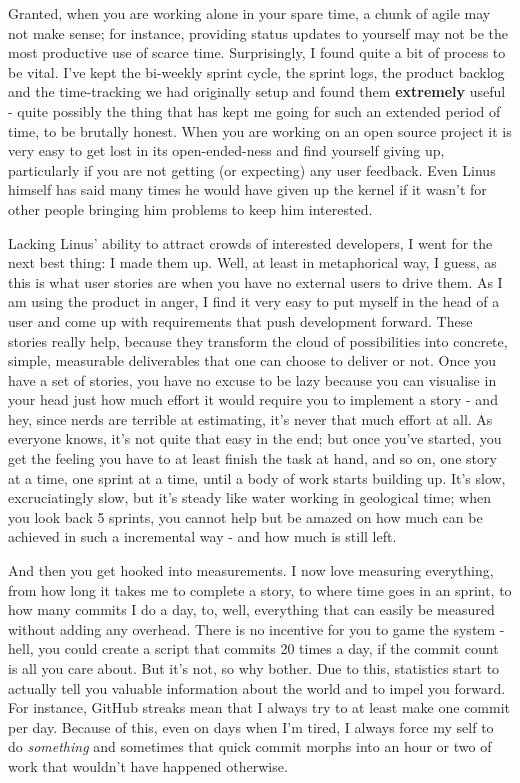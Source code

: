 \documentclass{book}
\begin{document}
Granted, when you are working alone in your spare time, a chunk of
agile may not make sense; for instance, providing status updates to
yourself may not be the most productive use of scarce
time. Surprisingly, I found quite a bit of process to be vital. I've
kept the bi-weekly sprint cycle, the sprint logs, the product backlog
and the time-tracking we had originally setup and found them
\textbf{extremely} useful - quite possibly the thing that has kept me going
for such an extended period of time, to be brutally honest. When you
are working on an open source project it is very easy to get lost in
its open-ended-ness and find yourself giving up, particularly if you
are not getting (or expecting) any user feedback. Even Linus himself
has said many times he would have given up the kernel if it wasn't for
other people bringing him problems to keep him interested.

Lacking Linus' ability to attract crowds of interested developers, I
went for the next best thing: I made them up. Well, at least in
metaphorical way, I guess, as this is what user stories are when you
have no external users to drive them. As I am using the product in
anger, I find it very easy to put myself in the head of a user and
come up with requirements that push development forward. These stories
really help, because they transform the cloud of possibilities into
concrete, simple, measurable deliverables that one can choose to
deliver or not. Once you have a set of stories, you have no excuse to
be lazy because you can visualise in your head just how much effort it
would require you to implement a story - and hey, since nerds are
terrible at estimating, it's never that much effort at all. As
everyone knows, it's not quite that easy in the end; but once you've
started, you get the feeling you have to at least finish the task at
hand, and so on, one story at a time, one sprint at a time, until a
body of work starts building up. It's slow, excruciatingly slow, but
it's steady like water working in geological time; when you look back
5 sprints, you cannot help but be amazed on how much can be achieved
in such a incremental way - and how much is still left.

And then you get hooked into measurements. I now love measuring
everything, from how long it takes me to complete a story, to where
time goes in an sprint, to how many commits I do a day, to, well,
everything that can easily be measured without adding any
overhead. There is no incentive for you to game the system - hell, you
could create a script that commits 20 times a day, if the commit count
is all you care about. But it's not, so why bother. Due to this,
statistics start to actually tell you valuable information about the
world and to impel you forward. For instance, GitHub streaks mean that
I always try to at least make one commit per day. Because of this,
even on days when I'm tired, I always force my self to do \emph{something}
and sometimes that quick commit morphs into an hour or two of work
that wouldn't have happened otherwise.
\end{document}
